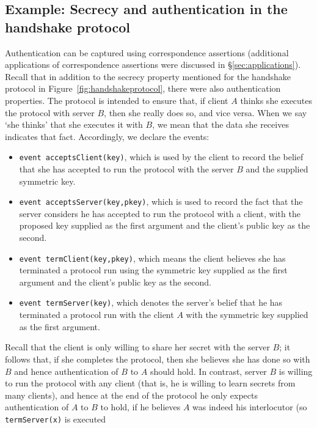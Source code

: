 \documentclass{book}
\newcommand{\tblue}[1]{\textcolor{blue}{REMARK: \emph{#1}}}
\renewcommand{\marginpar}[1]{\tblue{#1}}
\newcommand{\A}{A}
\newcommand{\B}{B}
\begin{document}
\subsection{Example: Secrecy and authentication in the handshake protocol}\label{sec:exampleAuthHandshake}

Authentication can be captured using correspondence assertions (additional applications of correspondence assertions were discussed in \S\ref{sec:applications}).
Recall that in addition to the secrecy property mentioned for the handshake protocol
in Figure~\ref{fig:handshakeprotocol}, there were also authentication properties. The protocol
is intended to ensure that, if client $\A$ thinks she executes the protocol
with server $\B$, then she really does so, and vice versa. When we say `she
thinks' that she executes it with $\B$, we mean that the data she
receives indicates that fact. Accordingly, we declare the events:
\begin{itemize}
\item \lstinline!event acceptsClient(key)!, which is used by the client
  to record the belief that she has accepted to run the protocol with the
  server $\B$ and the supplied symmetric key.

\item \lstinline!event acceptsServer(key,pkey)!, which is used to
  record the fact that the server considers he has accepted to run the
  protocol with a client, with the proposed key supplied as the first
  argument and the client's public key as the second.

\item \lstinline!event termClient(key,pkey)!, which means the
  client believes she has terminated a protocol run using the symmetric key supplied as the
  first argument and the client's public key as the second.

\item \lstinline!event termServer(key)!, which denotes the server's
  belief that he has terminated a protocol run with the client $\A$
  with the symmetric key supplied as the first argument.

\end{itemize}
Recall that the client is only willing to share her secret with the server $\B$; it follows that, if she completes the protocol, then she believes she has done so with $\B$ and hence authentication of $\B$ to $\A$ should hold. In contrast, server $\B$ is willing to run the protocol with any client (that is, he is willing to learn secrets from many clients), and hence at the end of the protocol he only expects authentication of $\A$ to $\B$ to hold, if he believes $\A$ was indeed his interlocutor (so \lstinline!termServer(x)! is executed
\end{document}
